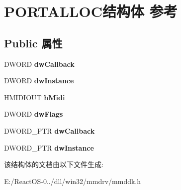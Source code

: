 \hypertarget{struct_p_o_r_t_a_l_l_o_c}{}\section{P\+O\+R\+T\+A\+L\+L\+O\+C结构体 参考}
\label{struct_p_o_r_t_a_l_l_o_c}
\subsection*{Public 属性}
\begin{DoxyCompactItemize}
\item 
\mbox{\label{struct_p_o_r_t_a_l_l_o_c_a604729e82d44147077ebe99eb2def587}} 
D\+W\+O\+RD {\bfseries dw\+Callback}
\item 
\mbox{\label{struct_p_o_r_t_a_l_l_o_c_a8a3075c2c383f25ee0268bfcb3ec913b}} 
D\+W\+O\+RD {\bfseries dw\+Instance}
\item 
\mbox{\label{struct_p_o_r_t_a_l_l_o_c_af402f280dab76117c488e96bcacabe11}} 
H\+M\+I\+D\+I\+O\+UT {\bfseries h\+Midi}
\item 
\mbox{\label{struct_p_o_r_t_a_l_l_o_c_a76757755bd743d44cf2b93e38470fbb6}} 
D\+W\+O\+RD {\bfseries dw\+Flags}
\item 
\mbox{\label{struct_p_o_r_t_a_l_l_o_c_a8918fc9467af1ad033433f256abe30f4}} 
D\+W\+O\+R\+D\+\_\+\+P\+TR {\bfseries dw\+Callback}
\item 
\mbox{\label{struct_p_o_r_t_a_l_l_o_c_a87de77e1a78e5ffb60276f0fbb02d1cb}} 
D\+W\+O\+R\+D\+\_\+\+P\+TR {\bfseries dw\+Instance}
\end{DoxyCompactItemize}


该结构体的文档由以下文件生成\+:\begin{DoxyCompactItemize}
\item 
E\+:/\+React\+O\+S-\/0../dll/win32/mmdrv/mmddk.\+h\end{DoxyCompactItemize}
